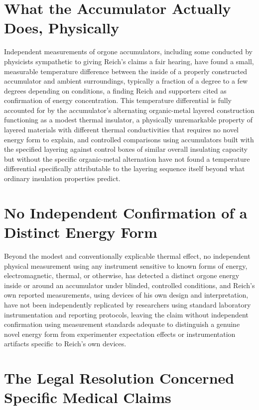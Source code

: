 \documentclass[11pt]{article}
\begin{document}
\section{What the Accumulator Actually Does, Physically}

Independent measurements of orgone accumulators, including some conducted by physicists sympathetic to giving Reich's claims a fair hearing, have found a small, measurable temperature difference between the inside of a properly constructed accumulator and ambient surroundings, typically a fraction of a degree to a few degrees depending on conditions, a finding Reich and supporters cited as confirmation of energy concentration. This temperature differential is fully accounted for by the accumulator's alternating organic-metal layered construction functioning as a modest thermal insulator, a physically unremarkable property of layered materials with different thermal conductivities that requires no novel energy form to explain, and controlled comparisons using accumulators built with the specified layering against control boxes of similar overall insulating capacity but without the specific organic-metal alternation have not found a temperature differential specifically attributable to the layering sequence itself beyond what ordinary insulation properties predict.

\section{No Independent Confirmation of a Distinct Energy Form}

Beyond the modest and conventionally explicable thermal effect, no independent physical measurement using any instrument sensitive to known forms of energy, electromagnetic, thermal, or otherwise, has detected a distinct orgone energy inside or around an accumulator under blinded, controlled conditions, and Reich's own reported measurements, using devices of his own design and interpretation, have not been independently replicated by researchers using standard laboratory instrumentation and reporting protocols, leaving the claim without independent confirmation using measurement standards adequate to distinguish a genuine novel energy form from experimenter expectation effects or instrumentation artifacts specific to Reich's own devices.

\section{The Legal Resolution Concerned Specific Medical Claims}
\end{document}
